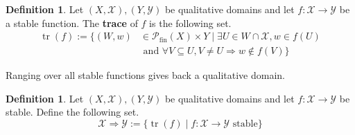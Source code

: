 \documentclass[12pt]{article}
\theoremstyle{plain}
\theoremstyle{definition}
\newtheorem{defn}[thm]{Definition} %
\newcommand{\scr}[1]{\mathscr{#1}}
\newcommand{\call}[1]{\mathcal{#1}}
\newcommand{\lto}{\longrightarrow}
\begin{document}
	\begin{defn}
		Let $(X, \scr{X}), (Y, \scr{Y})$ be qualitative domains and let $f: \scr{X} \lto \scr{Y}$ be a stable function. The \textbf{trace} of $f$ is the following set.
		\begin{align}
			\operatorname{tr}(f) := \{ (W, w) &\in \call{P}_{\text{fin}}(X) \times Y \mid \exists U \in W \cap \scr{X}, w \in f(U)\\
			&\text{ and }\forall V \subseteq U, V \neq U \Rightarrow w \not\in f(V) \}
			\end{align}
		\end{defn}
	
	Ranging over all stable functions gives back a qualitative domain.
	
	\begin{defn}\label{def:implication}
		Let $(X,\scr{X}), (Y, \scr{Y})$ be qualitative domains and let $f: \scr{X} \lto \scr{Y}$ be stable. Define the following set.
		\begin{equation}
			\scr{X} \Rightarrow \scr{Y} := \{ \operatorname{tr}(f) \mid f: \scr{X} \lto \scr{Y}\text{ stable} \}
			\end{equation}
		\end{defn}
	
\end{document}
